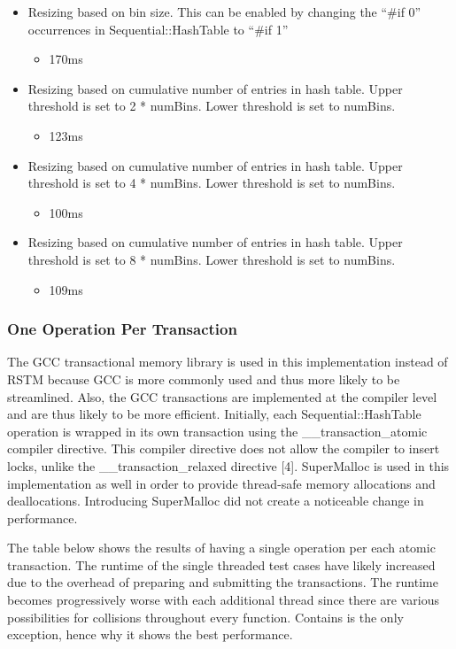 \documentclass[11pt]{article} %
\begin{document}
\begin{itemize}
	\item Resizing based on bin size. This can be enabled by changing the “\#if 0” occurrences in Sequential::HashTable to “\#if 1”
	\begin{itemize}
    		\item 170ms
	\end{itemize}
	\item Resizing based on cumulative number of entries in hash table. Upper threshold is set to 2 * numBins. Lower threshold is set to numBins.
	\begin{itemize}
		\item 123ms
	\end{itemize}
	\item Resizing based on cumulative number of entries in hash table. Upper threshold is set to 4 * numBins. Lower threshold is set to numBins.
	\begin{itemize}
		\item 100ms
	\end{itemize}
	\item Resizing based on cumulative number of entries in hash table. Upper threshold is set to 8 * numBins. Lower threshold is set to numBins.
	\begin{itemize}
		\item 109ms
	\end{itemize}
\end{itemize}

\subsubsection{One Operation Per Transaction}

The GCC transactional memory library is used in this implementation instead of RSTM because GCC is more commonly used and thus more likely to be streamlined. Also, the GCC transactions are implemented at the compiler level and are thus likely to be more efficient. Initially, each Sequential::HashTable operation is wrapped in its own transaction using the \_\_transaction\_atomic compiler directive. This compiler directive does not allow the compiler to insert locks, unlike the \_\_transaction\_relaxed directive [4]. SuperMalloc is used in this implementation as well in order to provide thread-safe memory allocations and deallocations. Introducing SuperMalloc did not create a noticeable change in performance.

The table below shows the results of having a single operation per each atomic transaction. The runtime of the single threaded test cases have likely increased due to the overhead of preparing and submitting the transactions. The runtime becomes progressively worse with each additional thread since there are various possibilities for collisions throughout every function. Contains is the only exception, hence why it shows the best performance.
\end{document}
